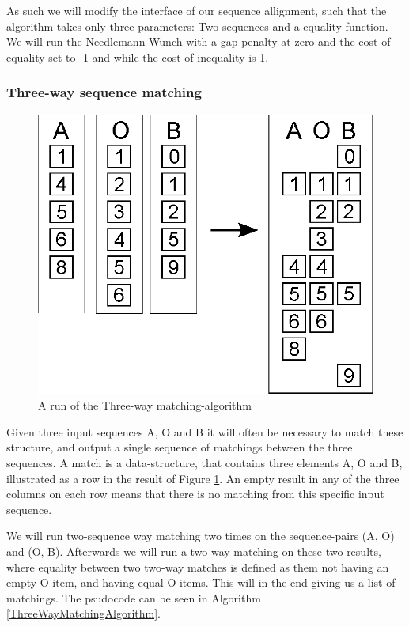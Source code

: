 \documentclass[11pt]{article}
\begin{document}
As such we will modify the interface of our sequence allignment, such that the algorithm takes only three parameters: Two sequences and a equality function. We will run the Needlemann-Wunch with a gap-penalty at zero and the cost of equality set to -1 and while the cost of inequality is 1.

\subsubsection{Three-way sequence matching}
\begin{figure}
   \centerline{\includegraphics[scale=0.4]{drawings/eps/threewaymatching.eps}}
   \caption{A run of the Three-way matching-algorithm}
   \label{ThreewayMatching}
\end{figure}

Given three input sequences A, O and B it will often be necessary to match these structure, and output a single sequence of matchings between the three sequences. A match is a data-structure, that contains three elements A, O and B, illustrated as a row in the result of Figure \ref{ThreewayMatching}. An empty result in any of the three columns on each row means that there is no matching from this specific input sequence.

We will run two-sequence way matching two times on the sequence-pairs (A, O) and (O, B). Afterwards we will run a two way-matching on these two results, where equality between two two-way matches is defined as them not having an empty O-item, and having equal O-items. This will in the end giving us a list of matchings. The psudocode can be seen in Algorithm \ref{ThreeWayMatchingAlgorithm}.
\end{document}
